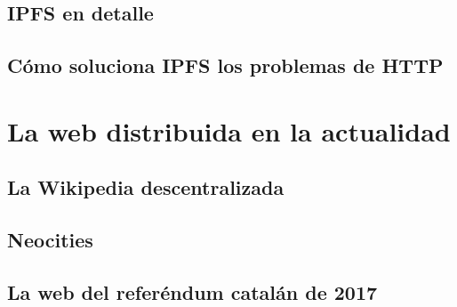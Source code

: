 \documentclass[12pt]{article} %
\begin{document}
\subsection{IPFS en detalle} %
\label{sub:ipfs_en_detalle}


\subsection{Cómo soluciona IPFS los problemas de HTTP} %
\label{sub:cómo_soluciona_ipfs_los_problemas_de_http}



\section{La web distribuida en la actualidad} %
\label{sec:la_web_distribuida_en_la_actualidad}

\subsection{La Wikipedia descentralizada} %
\label{sub:la_wikipedia_descentralizada}


\subsection{Neocities} %
\label{sub:neocities}


\subsection{La web del referéndum catalán de 2017} %
\label{sub:la_web_del_referéndum_catalán_de_2017}




\newpage
\printbibliography
\end{document}
